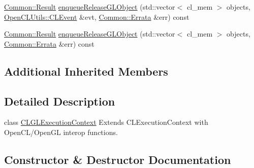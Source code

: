 \begin{DoxyCompactItemize}
\item 
\hyperlink{_errata_8h_a389396702f1aff6e71eb21328b0775c1}{Common\+::\+Result} \hyperlink{class_c_l_ray_tracer_1_1_c_l_g_l_interop_1_1_c_l_g_l_execution_context_a0af4a2fceda62535297fb5b70033826b}{enqueue\+Release\+G\+L\+Object} (std\+::vector$<$ cl\+\_\+mem $>$ objects, \hyperlink{class_c_l_ray_tracer_1_1_open_c_l_utils_1_1_c_l_event}{Open\+C\+L\+Utils\+::\+C\+L\+Event} \&evt, \hyperlink{class_c_l_ray_tracer_1_1_common_1_1_errata}{Common\+::\+Errata} \&err) const 
\item 
\hyperlink{_errata_8h_a389396702f1aff6e71eb21328b0775c1}{Common\+::\+Result} \hyperlink{class_c_l_ray_tracer_1_1_c_l_g_l_interop_1_1_c_l_g_l_execution_context_ab127d4b7e70b2e5b8431e6e615003597}{enqueue\+Release\+G\+L\+Object} (std\+::vector$<$ cl\+\_\+mem $>$ objects, \hyperlink{class_c_l_ray_tracer_1_1_common_1_1_errata}{Common\+::\+Errata} \&err) const 
\end{DoxyCompactItemize}
\subsection*{Additional Inherited Members}


\subsection{Detailed Description}
class \hyperlink{class_c_l_ray_tracer_1_1_c_l_g_l_interop_1_1_c_l_g_l_execution_context}{C\+L\+G\+L\+Execution\+Context} Extends C\+L\+Execution\+Context with Open\+C\+L/\+Open\+GL interop functions. 

\subsection{Constructor \& Destructor Documentation}
